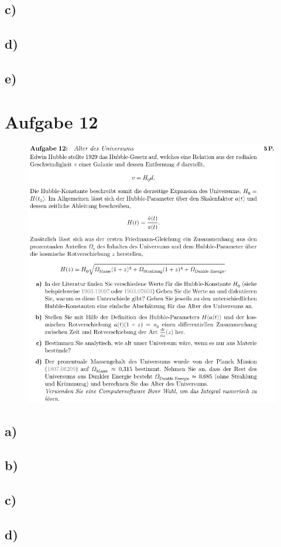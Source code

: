     \subsection{c)}

    \subsection{d)}

    \subsection{e)}

\section{Aufgabe 12}

    \begin{figure}[H]
        \centering
        \includegraphics[width=\textwidth]{images/Aufgabe12.jpg}
        \label{fig:5}
    \end{figure}

    \subsection{a)}

    \subsection{b)}

    \subsection{c)}

    \subsection{d)}